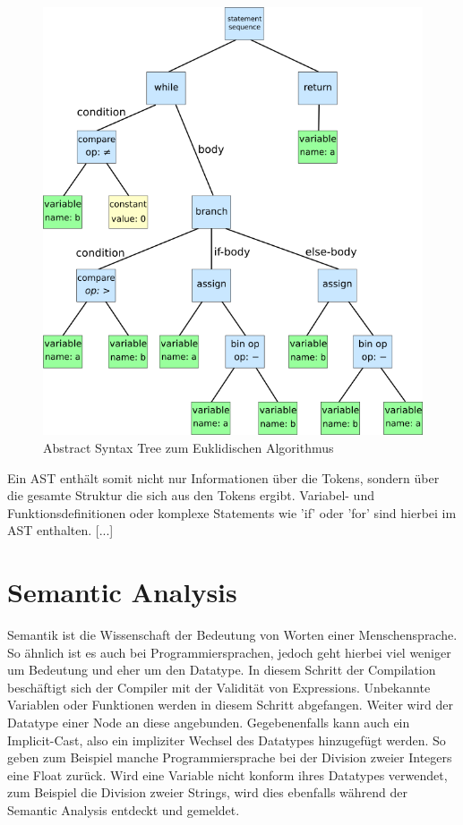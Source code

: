 \begin{figure}[h!]
    \centering
    \includegraphics[scale=0.3]{resources/images/syntaxtree.svg.png}
    \caption{Abstract Syntax Tree zum Euklidischen Algorithmus \cite{Parser:SyntaxTree}}
    \label{fig:syntax-tree}
\end{figure}

Ein AST enthält somit nicht nur Informationen über die Tokens, sondern über die gesamte Struktur die sich aus den Tokens ergibt. Variabel- und Funktionsdefinitionen oder komplexe Statements wie 'if' oder 'for' sind hierbei im AST enthalten.
[...]

\section{Semantic Analysis}
Semantik ist die Wissenschaft der Bedeutung von Worten einer Menschensprache. So ähnlich ist es auch bei Programmiersprachen, jedoch geht hierbei viel weniger um Bedeutung und eher um den Datatype.
In diesem Schritt der Compilation beschäftigt sich der Compiler mit der Validität von Expressions. Unbekannte Variablen oder Funktionen werden in diesem Schritt abgefangen.
Weiter wird der Datatype einer Node an diese angebunden. Gegebenenfalls kann auch ein Implicit-Cast, also ein impliziter Wechsel des Datatypes hinzugefügt werden.
So geben zum Beispiel manche Programmiersprache bei der Division zweier Integers eine Float zurück. Wird eine Variable nicht konform ihres Datatypes verwendet, zum Beispiel die Division zweier Strings,
wird dies ebenfalls während der Semantic Analysis entdeckt und gemeldet.


